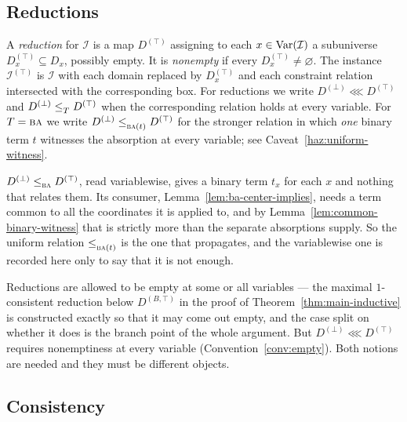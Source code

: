 \subsection{Reductions}

\begin{definition}[Reduction]\label{def:reduction}
A \emph{reduction} for $\mathcal I$ is a map $D^{(\top)}$ assigning to each
$x\in\operatorname{Var}(\mathcal I)$ a subuniverse $D^{(\top)}_{x}\subseteq D_{x}$, possibly
empty. It is \emph{nonempty} if every $D^{(\top)}_{x}\neq\varnothing$. The
instance $\mathcal I^{(\top)}$ is $\mathcal I$ with each domain replaced by
$D^{(\top)}_{x}$ and each constraint relation intersected with the
corresponding box. For reductions we write $D^{(\bot)}\lll D^{(\top)}$ and
$D^{(\bot)}\le_{T}^{}D^{(\top)}$ when the corresponding relation holds at every
variable. For $T=\textup{\textsc{ba}}$ we write $D^{(\bot)}\le_{\textup{\textsc{ba}}(t)}^{}D^{(\top)}$ for the
stronger relation in which \emph{one} binary term $t$ witnesses the absorption
at every variable; see Caveat~\ref{haz:uniform-witness}.
\end{definition}

\begin{hazard}\label{haz:uniform-witness}
$D^{(\bot)}\le_{\textup{\textsc{ba}}}^{}D^{(\top)}$, read variablewise, gives a binary term
$t_{x}$ for each $x$ and nothing that relates them. Its consumer,
Lemma~\ref{lem:ba-center-implies}, needs a term common to all the coordinates
it is applied to, and by Lemma~\ref{lem:common-binary-witness} that is strictly
more than the separate absorptions supply. So the uniform relation
$\le_{\textup{\textsc{ba}}(t)}^{}$ is the one that propagates, and the variablewise one is
recorded here only to say that it is not enough.
\end{hazard}

\begin{hazard}\label{haz:empty-reduction}
Reductions are allowed to be empty at some or all variables --- the maximal
$1$-consistent reduction below $D^{(B,\top)}$ in the proof of
Theorem~\ref{thm:main-inductive} is constructed exactly so that it may come out
empty, and the case split on whether it does is the branch point of the whole
argument. But $D^{(\bot)}\lll D^{(\top)}$ requires nonemptiness at every
variable (Convention~\ref{conv:empty}). Both notions are needed and they must
be different objects.
\end{hazard}

\subsection{Consistency}


